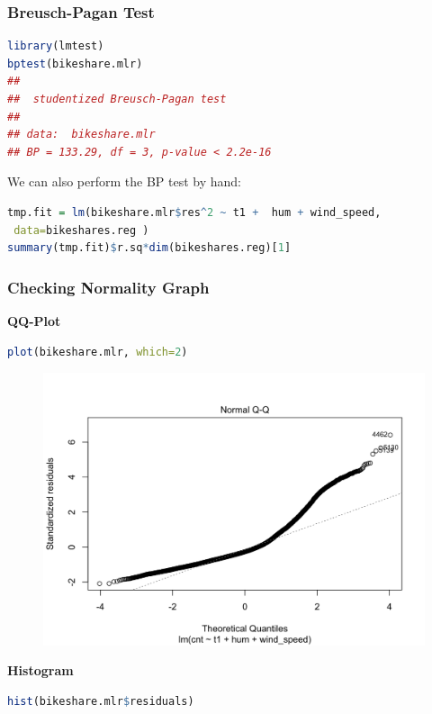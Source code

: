 \documentclass[11pt,a4paper]{article}
\begin{document}
\subsubsection{Breusch-Pagan Test}
\begin{lstlisting}[language=R]
library(lmtest)
bptest(bikeshare.mlr)
## 
##  studentized Breusch-Pagan test
## 
## data:  bikeshare.mlr
## BP = 133.29, df = 3, p-value < 2.2e-16
\end{lstlisting}
We can also perform the BP test by hand:
\begin{lstlisting}[language=R]
tmp.fit = lm(bikeshare.mlr$res^2 ~ t1 +  hum + wind_speed,
 data=bikeshares.reg )
summary(tmp.fit)$r.sq*dim(bikeshares.reg)[1]
\end{lstlisting}

\subsubsection{Checking Normality Graph}
\textbf{QQ-Plot}\\
\begin{lstlisting}[language=R]
plot(bikeshare.mlr, which=2)
\end{lstlisting}
\begin{center}\begin{figure}[htbp]
  \centering
  \includegraphics[scale=0.2]{d3.png}
  \caption{}
  \label{}
\end{figure}\end{center}
\textbf{Histogram}
\begin{lstlisting}[language=R]
hist(bikeshare.mlr$residuals)
\end{lstlisting}
\end{document}
